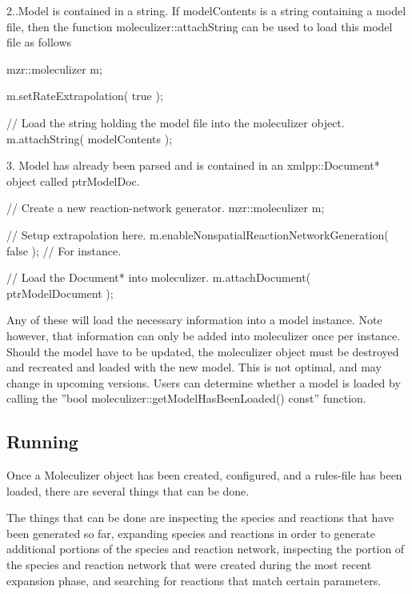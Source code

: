 2..Model is contained in a string.
If modelContents is a string containing a model file, then the
function moleculizer::attachString can be used to load this model file
as follows

\begin{ExampleCPP}[caption=Loading a MZR string into Moleculizer]
mzr::moleculizer m; 

m.setRateExtrapolation( true );

// Load the string holding the model file into the moleculizer object.
m.attachString( modelContents );
\end{ExampleCPP}

3.  Model has already been parsed and is contained in an
xmlpp::Document* object called ptrModelDoc.

\begin{ExampleCPP}[caption=Loading an XML document into moleculizer]
// Create a new reaction-network generator.
mzr::moleculizer m;

// Setup extrapolation here.
m.enableNonspatialReactionNetworkGeneration( false );  // For
instance.

// Load the Document* into moleculizer.
m.attachDocument( ptrModelDocument );
\end{ExampleCPP}

Any of these will load the necessary information into a model
instance. Note however, that information can only be added into
moleculizer once per instance.  Should the model have to be updated,
the moleculizer object must be destroyed and recreated and loaded with
the new model.  This is not optimal, and may change in upcoming
versions.  Users can determine whether a model is loaded by calling
the ''bool moleculizer::getModelHasBeenLoaded() const'' function.  

\subsection{Running}
Once a Moleculizer object has been created, configured, and a
rules-file has been loaded, there are several things that can be done.

The things that can be done are inspecting the species and reactions
that have been generated so far, expanding species and reactions in
order to generate additional portions of the species and reaction
network, inspecting the portion of the species and reaction network
that were created during the most recent expansion phase, and
searching for reactions that match certain parameters.  

